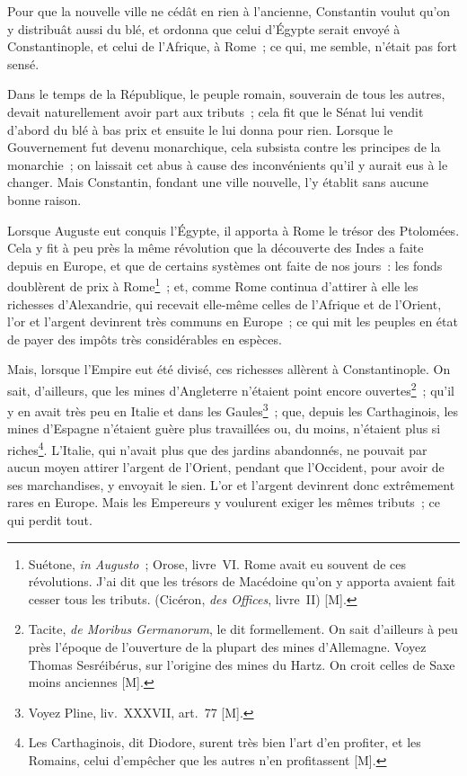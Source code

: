 \documentclass[french,twoside]{book} %
\begin{document}
Pour que la nouvelle ville ne cédât en rien à l’ancienne, Constantin voulut qu’on y distribuât aussi du blé, et ordonna que celui d’Égypte serait envoyé à Constantinople, et celui de l’Afrique, à Rome ; ce qui, me semble, n’était pas fort sensé.\par
Dans le temps de la République, le peuple romain, souverain de tous les autres, devait naturellement avoir part aux tributs ; cela fit que le Sénat lui vendit d’abord du blé à bas prix et ensuite le lui donna pour rien. Lorsque le Gouvernement fut devenu monarchique, cela subsista contre les principes de la monarchie ; on laissait cet abus à cause des inconvénients qu’il y aurait eus à le changer. Mais Constantin, fondant une ville nouvelle, l’y établit sans aucune bonne raison.\par
Lorsque Auguste eut conquis l’Égypte, il apporta à Rome le trésor des Ptolomées. Cela y fit à peu près la même révolution que la découverte des Indes a faite depuis en Europe, et que de certains systèmes ont faite de nos jours : les fonds doublèrent de prix à Rome\footnote{Suétone, {\itshape in Augusto} ; Orose, livre VI. Rome avait eu souvent de ces révolutions. J’ai dit que les trésors de Macédoine qu’on y apporta avaient fait cesser tous les tributs. (Cicéron, {\itshape des Offices}, livre II) [M].} ; et, comme Rome continua d’attirer à elle les richesses d’Alexandrie, qui recevait elle-même celles de l’Afrique et de l’Orient, l’or et l’argent devinrent très communs en Europe ; ce qui mit les peuples en état de payer des impôts très considérables en espèces.\par
Mais, lorsque l’Empire eut été divisé, ces richesses allèrent à Constantinople. On sait, d’ailleurs, que les mines d’Angleterre n’étaient point encore ouvertes\footnote{Tacite, {\itshape de Moribus Germanorum}, le dit formellement. On sait d’ailleurs à peu près l’époque de l’ouverture de la plupart des mines d’Allemagne. Voyez Thomas Sesréibérus, sur l’origine des mines du Hartz. On croit celles de Saxe moins anciennes [M].} ; qu’il y en avait très peu en Italie et dans les Gaules\footnote{Voyez Pline, liv. XXXVII, art. 77 [M].} ; que, depuis les Carthaginois, les mines d’Espagne n’étaient guère plus travaillées ou, du moins, n’étaient plus si riches\footnote{Les Carthaginois, dit Diodore, surent très bien l’art d’en profiter, et les Romains, celui d’empêcher que les autres n’en profitassent [M].}. L’Italie, qui n’avait plus que des jardins abandonnés, ne pouvait par aucun moyen attirer l’argent de l’Orient, pendant que l’Occident, pour avoir de ses marchandises, y envoyait le sien. L’or et l’argent devinrent donc extrêmement rares en Europe. Mais les Empereurs y voulurent exiger les mêmes tributs ; ce qui perdit tout.\par
\end{document}

